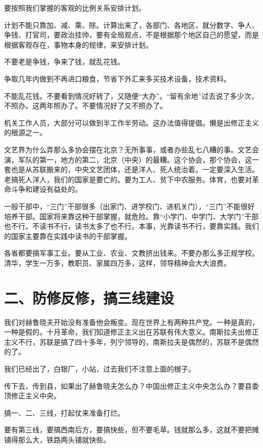 要按照我们掌握的客观的比例关系安排计划。

计划不能只靠加、减、乘、除。计算出来了，各部门、各地区，就分数字、争人、争钱、打官司，要政治挂帅，要有全局观点，不是根据那个地区自己的愿望，而是根据客观存在，事物本身的规律，来安排计划。

不要老是争钱，争来了钱，就乱花钱。

争取几年内做到不再进口粮食，节省下外汇来多买技术设备，技术资料。

不能乱花钱。不要看到情况好转了，又随便“大办”。“留有余地”过去说了多少次，不照办。这两年照办了。不要情况好了又不照办了。

机关工作人员，大部分可以做到半工作半劳动。这办法值得提倡。懒是出修正主义的根源之一。

文艺界为什么弄那么多协会摆在北京？无所事事，或者办些乱七八糟的事。文艺会演，军队的第一，地方的第二，北京（中央）的最糟。这个协会，那个协会，这一套也是从苏联搬来的，中央文艺团体，还是洋人、死人统治着。一定要深入生活。老搞死人洋人，我们的国家是要亡的。要为工人、贫下中农服务。体育，也要对革命斗争和建设有益处的。

一般干部中，“三门”干部很多（出家门、进学校门、进机关门），“三门”不能很好培养干部。国家将来靠这种干部掌握，就危险。靠“小学门、中学门、大学门”干部也不行。不读书不行，读书太多了也不行。本事，光靠读书不行，要靠实践。我们的国家主要靠在实践中读书的干部掌握。

各省都要搞军事工业。要从工业、农业、文教挤出钱来。不要办那么多正规学校。清华，学生一万多，教职员、家属四万多，这样，领导精神会大大浪费。

\date{一九六四年 六月八日}
\section{二、防修反修，搞三线建设}

我们对赫鲁晓夫开始没有准备他会叛变。现在世界上有两种共产党。一种是真的，一种是假的。十月革命，我们知道修正主义出在苏联有伟大意义。南斯拉夫出修正主义不行，苏联是搞了四十多年，列宁领导的，南斯拉夫是偶然的，苏联不是偶然的了。

我们已经出了，白银厂，小站，过去我们不注意上面的根子。

传下去，传到县，如果出了赫鲁晓夫怎么办？中国出修正主义中央怎么办？要县委顶修正主义中央。

搞一、二、三线，打起仗来准备打烂。

要有第三线，要搞西南后方，要搞快些，但不要毛草。钱就那么多，这就不要把摊铺得那么大，铁路两头铺就快些。

\date{一九六四年六月十六日}
